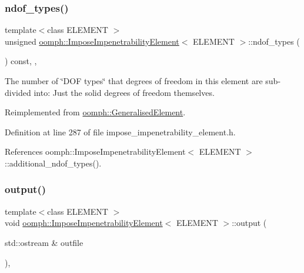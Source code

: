 \mbox{\label{classoomph_1_1ImposeImpenetrabilityElement_a0aa0ca45ff2d80ca16708224d09749de}} 
\subsubsection{\texorpdfstring{ndof\+\_\+types()}{ndof\_types()}}
{\footnotesize\ttfamily template$<$class E\+L\+E\+M\+E\+NT $>$ \\
unsigned \hyperlink{classoomph_1_1ImposeImpenetrabilityElement}{oomph\+::\+Impose\+Impenetrability\+Element}$<$ E\+L\+E\+M\+E\+NT $>$\+::ndof\+\_\+types (\begin{DoxyParamCaption}{ }\end{DoxyParamCaption}) const\hspace{0.3cm}{\ttfamily [inline]}, {\ttfamily [protected]}, {\ttfamily [virtual]}}



The number of \char`\"{}\+D\+O\+F types\char`\"{} that degrees of freedom in this element are sub-\/divided into\+: Just the solid degrees of freedom themselves. 



Reimplemented from \hyperlink{classoomph_1_1GeneralisedElement_a0c6037a870597b35dcf1c780710b9a56}{oomph\+::\+Generalised\+Element}.



Definition at line 287 of file impose\+\_\+impenetrability\+\_\+element.\+h.



References oomph\+::\+Impose\+Impenetrability\+Element$<$ E\+L\+E\+M\+E\+N\+T $>$\+::additional\+\_\+ndof\+\_\+types().

\mbox{\label{classoomph_1_1ImposeImpenetrabilityElement_a44097c20f6a16ab6a8f60daeaba7aa7d}} 
\subsubsection{\texorpdfstring{output()}{output()}\hspace{0.1cm}{\footnotesize\ttfamily [1/2]}}
{\footnotesize\ttfamily template$<$class E\+L\+E\+M\+E\+NT $>$ \\
void \hyperlink{classoomph_1_1ImposeImpenetrabilityElement}{oomph\+::\+Impose\+Impenetrability\+Element}$<$ E\+L\+E\+M\+E\+NT $>$\+::output (\begin{DoxyParamCaption}\item[{std\+::ostream \&}]{outfile }\end{DoxyParamCaption})\hspace{0.3cm}{\ttfamily [inline]}, {\ttfamily [virtual]}}



